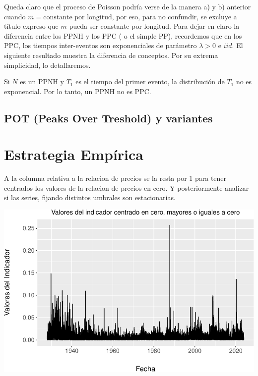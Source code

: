 \documentclass[
  oneside]{article}
\begin{document}
Queda claro que el proceso de Poisson podría verse de la manera a) y b)
anterior cuando \(m=\text{constante por longitud}\), por eso, para no
confundir, se excluye a título expreso que \(m\) pueda ser constante por
longitud. Para dejar en claro la diferencia entre los PPNH y los PPC ( o
el simple PP), recordemos que en los PPC, los tiempos inter-eventos son
exponenciales de parámetro \(\lambda>0\) e \(iid\). El siguiente
resultado muestra la diferencia de conceptos. Por su extrema
simplicidad, lo detallaremos.

\begin{theorem}\label{thm:2}
Si $N$ es un PPNH y $T_1$ es el tiempo del primer evento, la distribución de $T_1$ no es exponencial.
Por lo tanto, un PPNH no es PPC.
\end{theorem}

\newpage

\subsection{POT (Peaks Over Treshold) y variantes}

\newpage
\section{Estrategia Empírica}

A la columna relativa a la relacion de precios se la resta por 1 para
tener centrados los valores de la relacion de precios en cero. Y
posteriormente analizar si las series, fijando distintos umbrales son
estacionarias.

\includegraphics{Entrega_Laura_Montaldo_files/figure-latex/unnamed-chunk-20-1.pdf}
\end{document}
